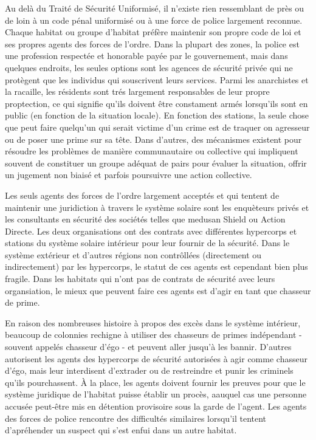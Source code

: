 Au delà du Traité de Sécurité Uniformisé, il n'existe rien ressemblant de près ou de loin à un code pénal uniformisé ou à une force de police largement reconnue. Chaque habitat ou groupe d'habitat préfère maintenir son propre code de loi et ses propres agents des forces de l'ordre. Dans la plupart des zones, la police est une profession respectée et honorable payée par le gouvernement, mais dans quelques endroits, les seules options sont les agences de sécurité privée qui ne protègent que les individus qui souscrivent leurs services. Parmi les anarchistes et la racaille, les résidents sont trés largement responsables de leur propre proptection, ce qui signifie qu'ils doivent être constament armés lorsqu'ils sont en public (en fonction de la situation locale). En fonction des stations, la seule chose que peut faire quelqu'un qui serait victime d'un crime est de traquer on agresseur ou de poser une prime sur sa tête. Dans d'autres, des mécanismes existent pour résoudre les problèmes de manière communautaire ou collective qui impliquent souvent de constituer un groupe adéquat de pairs pour évaluer la situation, offrir un jugement non biaisé et parfois poursuivre une action collective. 

Les seuls agents des forces de l'ordre largement acceptés et qui tentent de maintenir une juridiction à travers le système solaire sont les enquèteurs privés et les consultants en sécurité des sociétés telles que medusan Shield ou Action Directe. Les deux organisations ont des contrats avec différentes hypercorps et stations du système solaire intérieur pour leur fournir de la sécurité. Dans le système extérieur et d'autres régions non contrôllées (directement ou indirectement) par les hypercorps, le statut de ces agents est cependant bien plus fragile. Dans les habitats qui n'ont pas de contrats de sécurité avec leurs organsiation, le mieux que peuvent faire ces agents est d'agir en tant que chasseur de prime. 

En raison des nombreuses histoire à propos des excès dans le système intérieur, beaucoup de colonnies rechigne à utiliser des chasseurs de primes indépendant - souvent appelés chasseur d'égo - et peuvent aller jusqu'à les bannir. D'autres autorisent les agents des hypercorps de sécurité autorisées à agir comme chasseur d'égo, mais leur interdisent d'extrader ou de restreindre et punir les criminels qu'ils pourchassent. À la place, les agents doivent fournir les preuves pour que le système juridique de l'habitat puisse établir un procès, aauquel cas une personne accusée peut-être mis en détention provisoire sous la garde de l'agent. Les agents des forces de police rencontre des difficultés similaires lorsqu'il tentent d'apréhender un suspect qui s'est enfui dans un autre habitat. 

